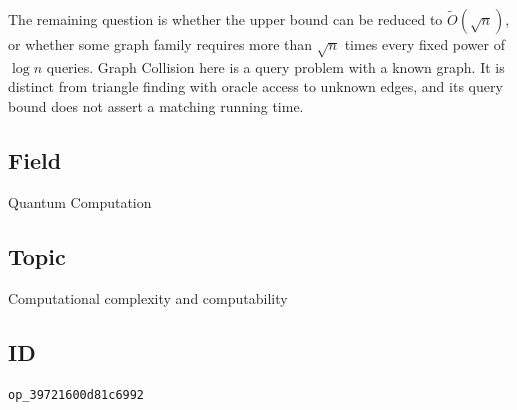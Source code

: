 The remaining question is whether the upper bound can be reduced to
$\widetilde O(\sqrt n)$, or whether some graph family requires more than
$\sqrt n$ times every fixed power of $\log n$ queries.
Graph Collision here is a query problem with a known graph.
It is distinct from triangle finding with oracle access to unknown edges,
and its query bound does not assert a matching running time.

\subsection*{Field}

Quantum Computation

\subsection*{Topic}

Computational complexity and computability

\subsection*{ID}

\texttt{op\_39721600d81c6992}
